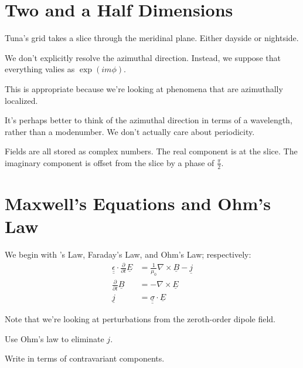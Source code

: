\section{Two and a Half Dimensions}

Tuna's grid takes a slice through the meridinal plane. Either dayside or nightside. 

We don't explicitly resolve the azimuthal direction. Instead, we suppose that everything valies as $\exp(i m \phi)$. 

This is appropriate because we're looking at phenomena that are azimuthally localized. 

It's perhaps better to think of the azimuthal direction in terms of a wavelength, rather than a modenumber. We don't actually care about periodicity. 

Fields are all stored as complex numbers. The real component is at the slice. The imaginary component is offset from the slice by a phase of $\frac{\pi}{2}$. 

\section{Maxwell's Equations and Ohm's Law}

We begin with \Ampere's Law, Faraday's Law, and Ohm's Law; respectively: 
\begin{align}
  \underline{ \underline{\epsilon} } \cdot \frac{\partial}{\partial t} \underline{E} & = \frac{1}{\mu_0} \nabla \times \underline{B} - \underline{j} \\
  \frac{\partial}{\partial t} \underline{B} & = - \nabla \times \underline{E} \\
  \underline{j} & = \underline{ \underline{\sigma} } \cdot \underline{E}
\end{align}

Note that we're looking at perturbations from the zeroth-order dipole field. 

Use Ohm's law to eliminate $j$. 

Write in terms of contravariant components. 


